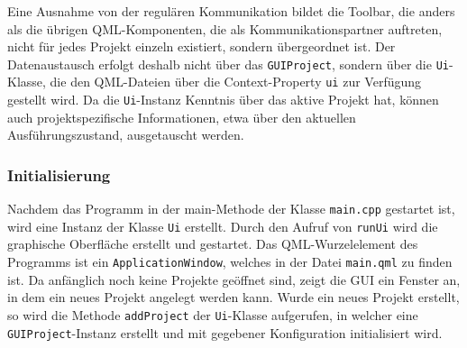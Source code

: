 Eine Ausnahme von der regulären Kommunikation bildet die Toolbar, die anders als
die übrigen QML-Komponenten, die als Kommunikationspartner auftreten, nicht für
jedes Projekt einzeln existiert, sondern übergeordnet ist. Der Datenaustausch
erfolgt deshalb nicht über das \texttt{GUIProject}, sondern über die
\texttt{Ui}-Klasse, die den QML-Dateien über die Context-Property \texttt{ui}
zur Verfügung gestellt wird. Da die \texttt{Ui}-Instanz Kenntnis über das aktive
Projekt hat, können auch projektspezifische Informationen, etwa über den
aktuellen Ausführungszustand, ausgetauscht werden.

\subsubsection{Initialisierung}

 Nachdem das Programm in der
main-Methode der Klasse \texttt{main.cpp} gestartet ist, wird eine Instanz der
Klasse \texttt{Ui} erstellt. Durch den Aufruf von \texttt{runUi} wird die
graphische Oberfläche erstellt und gestartet. Das QML-Wurzelelement des
Programms ist ein \texttt{ApplicationWindow}, welches in der Datei
\texttt{main.qml} zu finden ist. Da anfänglich noch keine Projekte geöffnet
sind, zeigt die GUI ein Fenster an, in dem ein neues Projekt angelegt werden
kann. Wurde ein neues Projekt erstellt, so wird die Methode \texttt{addProject}
der \texttt{Ui}-Klasse aufgerufen, in welcher eine \texttt{GUIProject}-Instanz
erstellt und mit gegebener Konfiguration initialisiert wird.
